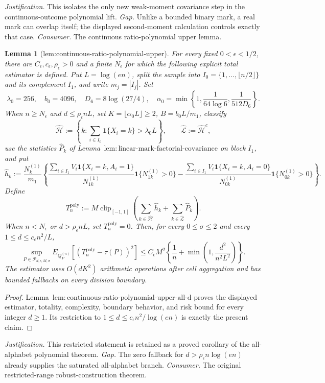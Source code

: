 \documentclass{article}
\newtheorem{lemma}{Lemma}
\begin{document}
\par\smallskip\noindent \textit{Justification.} This isolates the only new weak-moment covariance step in the continuous-outcome polynomial lift. \textit{Gap.} Unlike a bounded binary mark, a real mark can overlap itself; the displayed second-moment calculation controls exactly that case. \textit{Consumer.} The continuous ratio-polynomial upper lemma.

\begin{lemma}[lem:continuous-ratio-polynomial-upper]\label{lem:continuous-ratio-polynomial-upper}
For every fixed \(0<\epsilon<1/2\), there are \(C_{\epsilon},c_{\epsilon},\rho_{\epsilon}>0\) and a finite \(N_{\epsilon}\) for which the following explicit total estimator is defined.  Put \(L=\log(en)\), split the sample into \(I_0=\{1,\ldots,\lfloor n/2\rfloor\}\) and its complement \(I_1\), and write \(m_j=|I_j|\).  Set
\[
 \lambda_0=256,\quad b_0=4096,\quad D_6=8\log(27/4),\quad
 \alpha_0=\min\left\{1,\frac1{64\log6},\frac1{512D_6}\right\}.
\]
When \(n\ge N_{\epsilon}\) and \(d\le\rho_{\epsilon}nL\), set \(K=\lfloor\alpha_0L\rfloor\ge2\), \(B=b_0L/m_1\), classify
\[
 \widehat{\mathcal H}:=\left\{k:\sum_{i\in I_0}\mathbf 1\{X_i=k\}>\lambda_0L\right\},
 \qquad \widehat{\mathcal L}:=\widehat{\mathcal H}^{c},
\]
use the statistics \(\widehat P_k\) of Lemma~\(\mathrm{lem:linear\text{-}mark\text{-}factorial\text{-}covariance}\) on block \(I_1\), and put
\[
 \widehat h_k:=\frac{N_k^{(1)}}{m_1}\left\{
 \frac{\sum_{i\in I_1}V_i\mathbf 1\{X_i=k,A_i=1\}}{N_{1k}^{(1)}}\mathbf 1\{N_{1k}^{(1)}>0\}
 -\frac{\sum_{i\in I_1}V_i\mathbf 1\{X_i=k,A_i=0\}}{N_{0k}^{(1)}}\mathbf 1\{N_{0k}^{(1)}>0\}
 \right\}.
\]
Define
\[
 T_n^{\mathrm{poly}}:=M\operatorname{clip}_{[-1,1]}\!\left(
 \sum_{k\in\widehat{\mathcal H}}\widehat h_k+
 \sum_{k\in\widehat{\mathcal L}}\widehat P_k\right).
\]
When \(n<N_{\epsilon}\) or \(d>\rho_{\epsilon}nL\), set \(T_n^{\mathrm{poly}}=0\).  Then, for every \(0\le\sigma\le2\) and every \(1\le d\le c_{\epsilon}n^2/L\),
\[
 \sup_{P\in\mathcal P_{d,\epsilon,M,\sigma}}
 E_{Q_P^{(n)}}[(T_n^{\mathrm{poly}}-\tau(P))^2]
 \le C_{\epsilon}M^2\left\{\frac1n+\min\left(1,\frac{d^2}{n^2L^2}\right)\right\}.
\]
The estimator uses \(O(dK^2)\) arithmetic operations after cell aggregation and has bounded fallbacks on every division boundary.
\end{lemma}
\begin{proof}
Lemma~\(\mathrm{lem:continuous\text{-}ratio\text{-}polynomial\text{-}upper\text{-}all\text{-}d}\) proves the displayed estimator, totality, complexity, boundary behavior, and risk bound for every integer \(d\ge1\).  Its restriction to \(1\le d\le c_{\epsilon}n^2/\log(en)\) is exactly the present claim.
\end{proof}
\par\smallskip\noindent \textit{Justification.} This restricted statement is retained as a proved corollary of the all-alphabet polynomial theorem. \textit{Gap.} The zero fallback for \(d>\rho_{\epsilon}n\log(en)\) already supplies the saturated all-alphabet branch. \textit{Consumer.} The original restricted-range robust-construction theorem.
\end{document}
